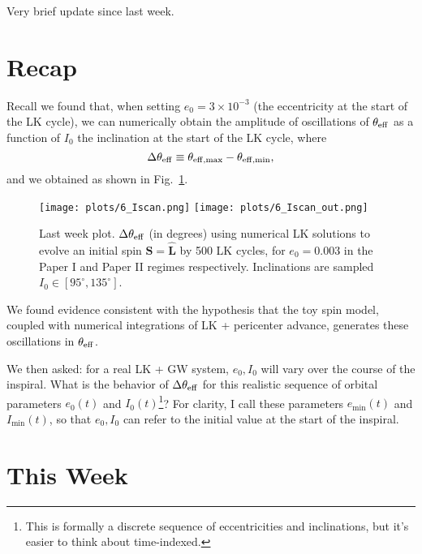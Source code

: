 \documentclass[11pt,
        usenames, %
        dvipsnames %
    ]{article}
\newcommand*{\bm}[1]{\boldsymbol{\mathbf{#1}}}
\newcommand*{\uv}[1]{\hat{\bm{#1}}}
\begin{document}
\def\Snospace~{\S{}} %
\renewcommand*{\sectionautorefname}{\Snospace}
\renewcommand*{\appendixautorefname}{\Snospace}
\renewcommand*{\figureautorefname}{Fig.}
\renewcommand*{\equationautorefname}{Eq.}
\renewcommand*{\tableautorefname}{Tab.}

Very brief update since last week.

\section{Recap}

Recall we found that, when setting $e_0 = 3 \times 10^{-3}$ (the eccentricity at
the start of the LK cycle), we can numerically obtain the amplitude of
oscillations of $\theta_{\rm eff}$ as a function of $I_0$ the inclination at the
start of the LK cycle, where
\begin{equation}
    \Delta \theta_{\rm eff} \equiv \theta_{\rm eff, \max} - \theta_{\rm eff,
        \min},
\end{equation}
and we obtained as shown in Fig.~\ref{fig:Iscan}.
\begin{figure}
    \centering
    \texttt{[image: plots/6\_Iscan.png]}
    \texttt{[image: plots/6\_Iscan\_out.png]}
    \caption{Last week plot. $\Delta \theta_{\rm eff}$ (in degrees) using
    numerical LK solutions to evolve an initial spin $\uv{S} = \uv{L}$ by 500 LK
    cycles, for $e_0 = 0.003$ in the Paper I and Paper II regimes respectively.
    Inclinations are sampled $I_0 \in [95^\circ, 135^\circ]$.}\label{fig:Iscan}
\end{figure}
We found evidence consistent with the hypothesis that the toy spin model,
coupled with numerical integrations of LK + pericenter advance, generates these
oscillations in $\theta_{\rm eff}$.

We then asked: for a real LK + GW system, $e_0, I_0$ will vary over the course
of the inspiral. What is the behavior of $\Delta \theta_{\rm eff}$ for this
realistic sequence of orbital parameters $e_0(t)$ and $I_0(t)$\footnote{This is
formally a discrete sequence of eccentricities and inclinations, but it's easier
to think about time-indexed.}? For clarity, I call these parameters
$e_{\min}(t)$ and $I_{\min}(t)$, so that $e_0, I_0$ can refer to the initial
value at the start of the inspiral.

\section{This Week}
\end{document}
